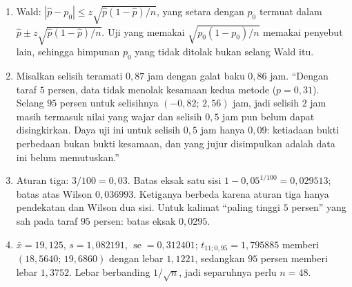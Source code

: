 \begin{enumerate}[label=\textbf{20.\arabic*}]
  \item Wald: $|\hat p-p_{0}|\le z\sqrt{\hat p(1-\hat p)/n}$, yang setara dengan
        $p_{0}$ termuat dalam $\hat p\pm z\sqrt{\hat p(1-\hat p)/n}$. Uji yang memakai
        $\sqrt{p_{0}(1-p_{0})/n}$ memakai penyebut lain, sehingga himpunan $p_{0}$
        yang tidak ditolak bukan selang Wald itu.

  \item 
Misalkan selisih teramati $0{,}87$ jam dengan galat baku $0{,}86$ jam.
``Dengan taraf $5$ persen, data tidak menolak kesamaan kedua metode
        ($p=0{,}31$). Selang $95$ persen untuk selisihnya $(-0{,}82;\,2{,}56)$ jam,
        jadi selisih $2$ jam masih termasuk nilai yang wajar dan selisih $0{,}5$ jam
        pun belum dapat disingkirkan. Daya uji ini untuk selisih $0{,}5$ jam hanya
        $0{,}09$: ketiadaan bukti perbedaan bukan bukti kesamaan, dan yang jujur
        disimpulkan adalah data ini belum memutuskan.''

  \item Aturan tiga: $3/100=0{,}03$. Batas eksak satu sisi
        $1-0{,}05^{1/100}=0{,}029513$; batas atas Wilson $0{,}036993$. Ketiganya
        berbeda karena aturan tiga hanya pendekatan dan Wilson dua sisi. Untuk
        kalimat ``paling tinggi $5$ persen'' yang sah pada taraf $95$ persen:
        batas eksak $0{,}0295$.

  \item $\bar x=19{,}125$, $s=1{,}082191$, $\operatorname{se}=0{,}312401$;
        $t_{11;0{,}95}=1{,}795885$ memberi $(18{,}5640;\,19{,}6860)$ dengan lebar
        $1{,}1221$, sedangkan $95$ persen memberi lebar $1{,}3752$. Lebar berbanding
        $1/\sqrt{n}$, jadi separuhnya perlu $n=48$.
\end{enumerate}

